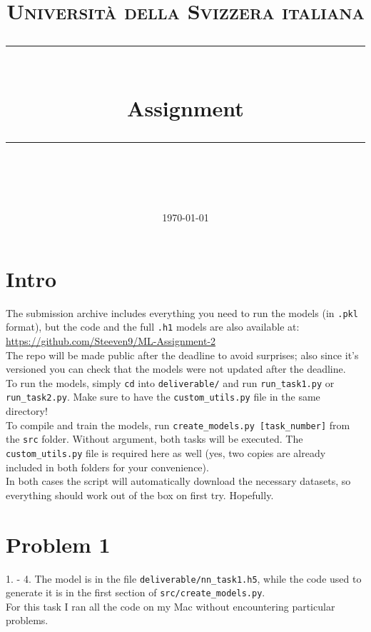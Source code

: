 \documentclass[11pt]{scrartcl}
\title{	
	\normalfont\normalsize
	\textsc{\thecourse\\%
	Università della Svizzera italiana}\\
	\vspace{25pt}
	\rule{\linewidth}{0.5pt}\\
	\vspace{20pt}
	{\huge Assignment \theassnumber}\\
	\vspace{12pt}
	\rule{\linewidth}{0.5pt}\\
	\vspace{12pt}
}
\author{\LARGE \thestudent}
\date{\normalsize\today}
\begin{document}
\maketitle


\section*{Intro}

	The submission archive includes everything you need to run the models (in \texttt{.pkl} format), but the code and the full \texttt{.h1} models are also available at:\\

	\url{https://github.com/Steeven9/ML-Assignment-2}\\

	The repo will be made public after the deadline to avoid surprises; also since it's versioned you can check that the models were not updated after the deadline.\\

	To run the models, simply \texttt{cd} into \texttt{deliverable/} and run \texttt{run\_task1.py} or \texttt{run\_task2.py}. Make sure to have the \texttt{custom\_utils.py} file in the same directory!\\

	To compile and train the models, run \texttt{create\_models.py [task\_number]} from the \texttt{src} folder. Without argument, both tasks will be executed. The \texttt{custom\_utils.py} file is required here as well (yes, two copies are already included in both folders for your convenience).\\

	In both cases the script will automatically download the necessary datasets, so everything should work out of the box on first try. Hopefully.


\newpage
\section*{Problem 1}

	1. - 4. The model is in the file \texttt{deliverable/nn\_task1.h5}, while the code used to 
	generate it is in the first section of \texttt{src/create\_models.py}.\\
	For this task I ran all the code on my Mac without encountering particular problems.\\
	
\end{document}
